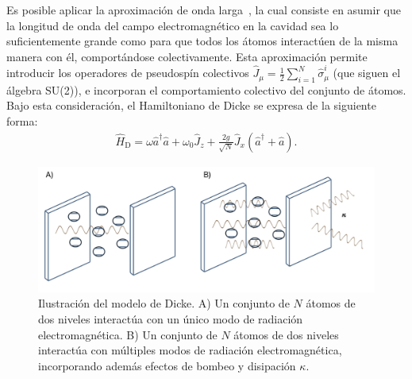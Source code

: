 \documentclass[onecolumn,notitlepage,letterpaper,aps,pra,12pt]{article}
\numberwithin{equation}{section}
\begin{document}
Es posible aplicar la aproximación de onda larga~\cite{Dicke54}, la cual consiste en asumir que la longitud de onda del campo electromagnético en la cavidad sea lo suficientemente grande como para que todos los átomos interactúen de la misma manera con él, comportándose colectivamente. Esta aproximación permite introducir los operadores de pseudospín colectivos  $\hat{J}_{\mu} = \frac{1}{2}\sum_{i=1}^{N}\hat{\sigma}_{\mu}^{i}$ (que siguen el álgebra SU(2)),  e incorporan el comportamiento colectivo del conjunto de átomos. Bajo esta consideración, el Hamiltoniano de Dicke se expresa de la siguiente forma: 
\begin{gather}\label{Dicke colectivo}
    \hat{H}_{\text{D}} = \omega\hat{a}^{\dagger}\hat{a} + \omega_{0}\hat{J}_{z} + \frac{2g}{\sqrt{N}}\hat{J}_{x}\left( \hat{a}^{\dagger} + \hat{a} \right).
\end{gather}
\begin{figure}[H]
    \centering
    \includegraphics[width=0.9
\linewidth]{Images/cavity1.png}
    \caption{Ilustración del modelo de Dicke. 
A) Un conjunto de \( N \) átomos de dos niveles interactúa con un único modo de radiación electromagnética. 
B) Un conjunto de \( N \) átomos de dos niveles interactúa con múltiples modos de radiación electromagnética, incorporando además efectos de bombeo y disipación \( \kappa \).}
    \label{Figure Cavity}
\end{figure}
\end{document}

